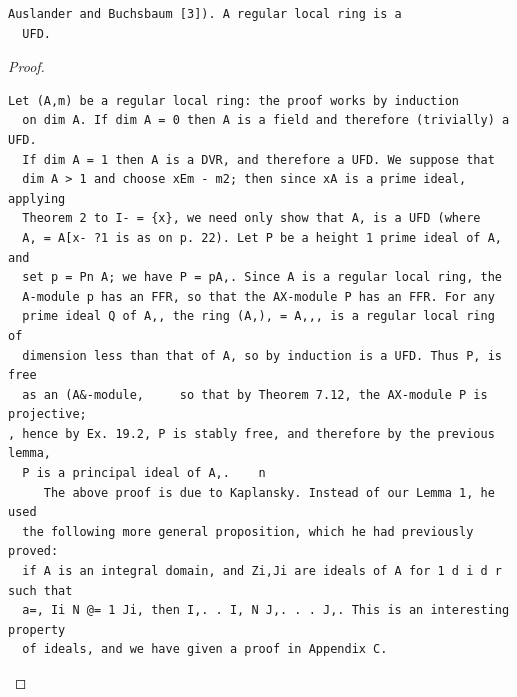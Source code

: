 \begin{theorem}\label{mcrt-auto-theorem-20-3}\uses{}
\begin{verbatim}
Auslander and Buchsbaum [3]). A regular local ring is a
  UFD.
\end{verbatim}
\end{theorem}
\begin{proof}
\begin{verbatim}
Let (A,m) be a regular local ring: the proof works by induction
  on dim A. If dim A = 0 then A is a field and therefore (trivially) a UFD.
  If dim A = 1 then A is a DVR, and therefore a UFD. We suppose that
  dim A > 1 and choose xEm - m2; then since xA is a prime ideal, applying
  Theorem 2 to I- = {x}, we need only show that A, is a UFD (where
  A, = A[x- ?1 is as on p. 22). Let P be a height 1 prime ideal of A, and
  set p = Pn A; we have P = pA,. Since A is a regular local ring, the
  A-module p has an FFR, so that the AX-module P has an FFR. For any
  prime ideal Q of A,, the ring (A,), = A,,, is a regular local ring of
  dimension less than that of A, so by induction is a UFD. Thus P, is free
  as an (A&-module,     so that by Theorem 7.12, the AX-module P is projective;
, hence by Ex. 19.2, P is stably free, and therefore by the previous lemma,
  P is a principal ideal of A,.    n
     The above proof is due to Kaplansky. Instead of our Lemma 1, he used
  the following more general proposition, which he had previously proved:
  if A is an integral domain, and Zi,Ji are ideals of A for 1 d i d r such that
  a=, Ii N @= 1 Ji, then I,. . I, N J,. . . J,. This is an interesting property
  of ideals, and we have given a proof in Appendix C.
\end{verbatim}
\end{proof}


